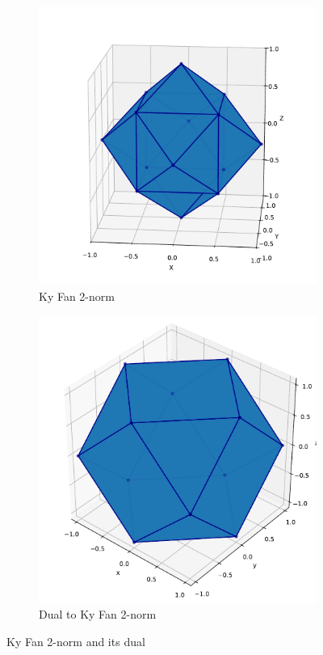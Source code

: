 \documentclass{article} %
\begin{document}
\begin{figure}[h!]
    \centering
    \begin{subfigure}[b]{0.45\linewidth}
        \centering
        \includegraphics[width=\linewidth]{KyFan.pdf}
        \caption{Ky Fan 2-norm}
        \label{fig:kyfan}
    \end{subfigure}
    \hfill
    \begin{subfigure}[b]{0.45\linewidth}
        \centering
        \includegraphics[width=\linewidth]{KyFanDual.pdf}
        \caption{Dual to Ky Fan 2-norm}
        \label{fig:kyfandual}
    \end{subfigure}
    \caption{Ky Fan 2-norm and its dual}
    \label{fig:kyfan_combined}
\end{figure}
\end{document}
